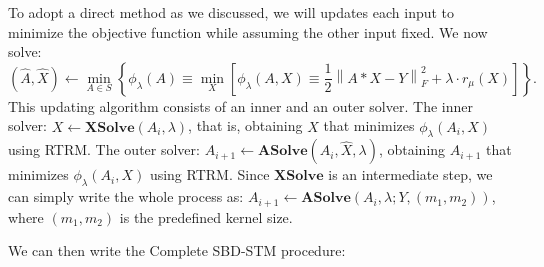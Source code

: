 To adopt a direct method as we discussed, we will updates each input to minimize the objective function while assuming the other input fixed. We now solve: 
\begin{equation}
	\label{sbdalgorithm}
	(\hat{A}, \hat{X}) \leftarrow \min_{{A} \in {S}} \left\{ 
	\phi_{\lambda}({A}) \equiv \min_{X} \left[ 
	\phi_{\lambda}({A}, {X}) \equiv \frac{1}{2} \left\| {A} * {X} - {Y} \right\|_F^2 
	+ \lambda \cdot r_{\mu}({X}) 
	\right] 
	\right\}.
\end{equation}
This updating algorithm consists of an inner and an outer solver. The inner solver: $X \leftarrow \mathbf{XSolve}(A_{i}, \lambda)$, that is, obtaining $\hat{X}$ that minimizes $\phi_{\lambda}(A_{i},X)$ using \ac{RTRM}. The outer solver: $A_{i+1} \leftarrow \mathbf{ASolve}(A_{i}, \hat{X}, \lambda)$, obtaining $A_{i+1}$ that minimizes $\phi_{\lambda}(A_{i},X)$ using \ac{RTRM}. Since $\mathbf{XSolve}$ is an intermediate step, we can simply write the whole process as: $A_{i+1} \leftarrow \mathbf{ASolve}(A_{i}, \lambda; Y,(m_1,m_2))$, where $(m_1,m_2)$ is the predefined kernel size. 

We can then write the Complete SBD-STM procedure: 

